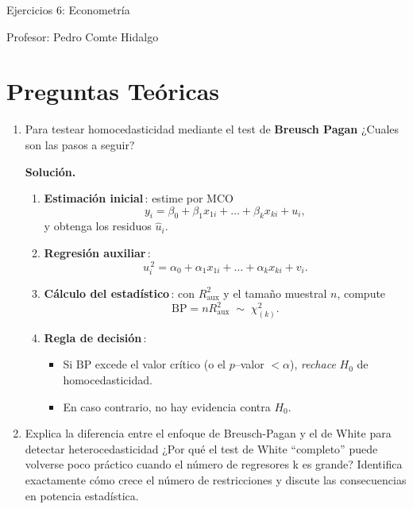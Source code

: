 \documentclass[10pt,a4paper]{article}
\begin{document}
\vspace{5cm}

\begin{center}
    {\Large  Ejercicios 6: Econometría }

Profesor:    Pedro Comte Hidalgo
\end{center}



\section{Preguntas Teóricas}
\begin{enumerate}

\item Para testear homocedasticidad mediante el test de \textbf{Breusch Pagan} ¿Cuales son las pasos a seguir?

        \textbf{Solución.}
\begin{enumerate}
  \item \textbf{Estimación inicial}\,: estime por MCO
        \[
          y_i=\beta_0+\beta_1x_{1i}+\dots+\beta_kx_{ki}+u_i,
        \]
        y obtenga los residuos $\hat u_i$.

  \item \textbf{Regresión auxiliar}\,:
        \[
         u_i^{\,2}=\alpha_0+\alpha_1x_{1i}+\dots+\alpha_kx_{ki}+v_i.
        \]

  \item \textbf{Cálculo del estadístico}\,: con $R_\text{aux}^{2}$ y
        el tamaño muestral $n$, compute
        \[
          \text{BP}=nR_\text{aux}^{2}\;\sim\;\chi^{2}_{(k)}.
        \]

  \item \textbf{Regla de decisión}\,: 
        \begin{itemize}
          \item Si $\text{BP}$ excede el valor crítico (o el $p$--valor
                $<\alpha$), \emph{rechace} $H_0$ de homocedasticidad.
          \item En caso contrario, no hay evidencia contra $H_0$.
        \end{itemize}
\end{enumerate}


 \item Explica la diferencia entre el enfoque de Breusch-Pagan y el de White para detectar heterocedasticidad ¿Por qué el test de White “completo” puede volverse poco práctico cuando el número de regresores k es grande? Identifica exactamente cómo crece el número de restricciones y discute las consecuencias en potencia estadística.
        

\end{enumerate}
\end{document}
